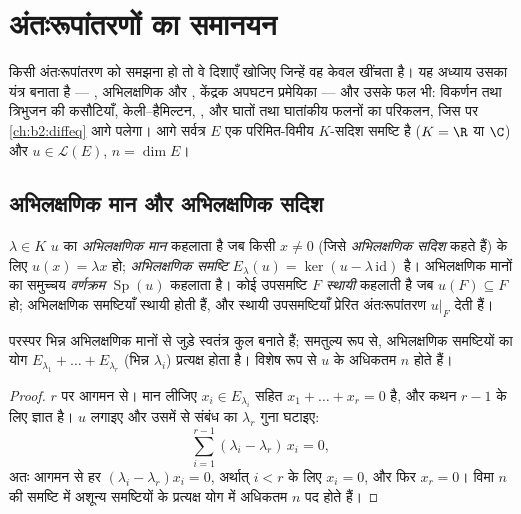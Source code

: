 \chapter{अंतःरूपांतरणों का समानयन}\label{ch:b2:reduction}

किसी अंतःरूपांतरण को समझना हो तो वे दिशाएँ खोजिए जिन्हें वह केवल खींचता
है। यह अध्याय उसका यंत्र बनाता है --- , अभिलक्षणिक और
, केंद्रक अपघटन प्रमेयिका --- और उसके फल भी: विकर्णन तथा
त्रिभुजन की कसौटियाँ, केली--हैमिल्टन, , और घातों तथा
घातांकीय फलनों का परिकलन, जिस पर \cref{ch:b2:diffeq} आगे पलेगा। आगे सर्वत्र $E$ एक
परिमित-विमीय $K$-सदिश समष्टि है ($K = \R$ या $\C$) और $u \in
\mathcal{L}(E)$, $n = \dim E$।

\section{अभिलक्षणिक मान और अभिलक्षणिक सदिश}

\begin{definition}\label{def:b2:reduction:eigen}
$\lambda \in K$ $u$ का \emph{अभिलक्षणिक मान} कहलाता है जब
किसी $x \neq 0$ (जिसे \emph{अभिलक्षणिक सदिश} कहते हैं) के लिए $u(x) = \lambda x$ हो;
\emph{अभिलक्षणिक समष्टि} $E_\lambda(u) =
\ker(u - \lambda\,\mathrm{id})$ है। अभिलक्षणिक मानों का समुच्चय
\emph{वर्णक्रम} $\operatorname{Sp}(u)$ कहलाता है। कोई उपसमष्टि $F$
\emph{स्थायी} कहलाती है जब $u(F) \subseteq F$ हो; अभिलक्षणिक समष्टियाँ स्थायी होती
हैं, और स्थायी उपसमष्टियाँ प्रेरित अंतःरूपांतरण $u|_F$ देती हैं।
\end{definition}

\begin{theorem}[अभिलक्षणिक समष्टियों की स्वतंत्रता]\label{thm:b2:reduction:independence}
परस्पर भिन्न अभिलक्षणिक मानों से जुड़े  स्वतंत्र कुल
बनाते हैं; समतुल्य रूप से, अभिलक्षणिक समष्टियों का योग $E_{\lambda_1} + \dots + E_{\lambda_r}$ (भिन्न $\lambda_i$)
प्रत्यक्ष होता है। विशेष रूप से $u$ के अधिकतम $n$  होते
हैं।
\end{theorem}

\begin{proof}
$r$ पर आगमन से। मान लीजिए $x_i \in
E_{\lambda_i}$ सहित $x_1 + \dots + x_r = 0$ है, और कथन $r - 1$ के लिए ज्ञात है।
$u$ लगाइए और उसमें से संबंध का $\lambda_r$ गुना घटाइए:
\[
\sum_{i=1}^{r-1} (\lambda_i - \lambda_r)\, x_i = 0 ,
\]
अतः आगमन से हर $(\lambda_i - \lambda_r)x_i = 0$, अर्थात् $i < r$ के लिए $x_i =
0$, और फिर $x_r = 0$। विमा $n$ की
समष्टि में अशून्य समष्टियों के प्रत्यक्ष योग में अधिकतम $n$ पद होते
हैं।
\end{proof}

